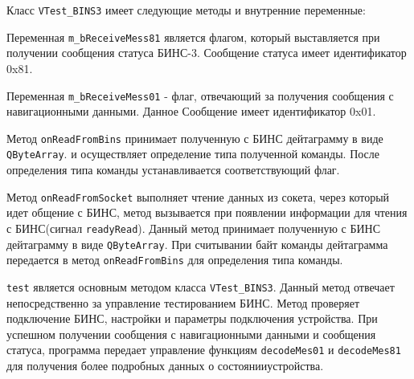 Класс \texttt{VTest\_BINS3} имеет следующие методы и внутренние переменные:
\begin{enum}
	\item Переменная \texttt{m\_bReceiveMess81} является флагом, который выставляется при получении сообщения
		статуса БИНС-3. Сообщение статуса имеет идентификатор 0x81.

	\item Переменная \texttt{m\_bReceiveMess01} - флаг, отвечающий за получения сообщения с навигационными данными.
		Данное Сообщение имеет идентификатор 0x01.

	\item Метод \texttt{onReadFromBins} принимает полученную с БИНС дейтаграмму в виде \texttt{QByteArray}.
		и осуществляет определение типа полученной команды. После определения типа команды устанавливается
		соответствующий флаг.

	\item Метод \texttt{onReadFromSocket} выполняет чтение данных из сокета, через который идет общение с БИНС,
		метод вызывается при появлении информации для чтения с БИНС(сигнал \texttt{readyRead}).
		Данный метод принимает полученную с БИНС дейтаграмму в виде \texttt{QByteArray}.
		При считывании байт команды дейтаграмма передается в метод \texttt{onReadFromBins} для определения типа
		команды.

	\item \texttt{test} является основным методом класса \texttt{VTest\_BINS3}. Данный метод отвечает
		непосредственно за управление тестированием БИНС. Метод проверяет подключение БИНС, настройки и
		параметры подключения устройства. При успешном получении сообщения с навигационными данными и сообщения
		статуса, программа передает управление функциям \texttt{decodeMes01} и \texttt{decodeMes81} для
		получения более подробных данных о состоянии\break устройства.


\end{enum}
